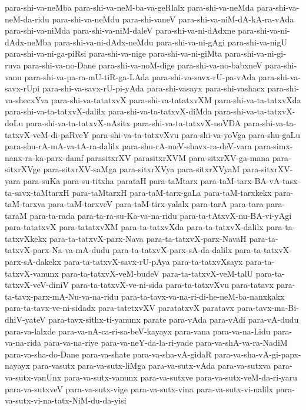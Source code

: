 {para-shi-va-neMba
para-shi-va-neM-ba-va-geRlalx
para-shi-va-neMda
para-shi-va-neM-da-ridu
para-shi-va-neMdu
para-shi-vaneV
para-shi-va-niM-dA-kA-ra-vAda
para-shi-va-niMda
para-shi-va-niM-daleV
para-shi-va-ni-dAdxne
para-shi-va-ni-dAdx-neMba
para-shi-va-ni-dAdx-neMdu
para-shi-va-ni-gAgi
para-shi-va-nigU
para-shi-va-ni-ga-piRsi
para-shi-va-nige
para-shi-va-ni-giMta
para-shi-va-ni-gi-ruva
para-shi-va-no-Dane
para-shi-va-noM-dige
para-shi-va-no-babxneV
para-shi-vanu
para-shi-va-pa-ra-mU-tiR-ga-LAda
para-shi-va-savx-rU-pa-vAda
para-shi-va-savx-rUpi
para-shi-va-savx-rU-pi-yAda
para-shi-vasayx
para-shi-vashacx
para-shi-va-shecxYva
para-shi-va-tatatxvX
para-shi-va-tatatxvXM
para-shi-va-ta-tatxvXda
para-shi-va-ta-tatxvX-dalilx
para-shi-va-ta-tatxvX-diMda
para-shi-va-ta-tatxvX-doLu
para-shi-va-ta-tatxvX-nAsitx
para-shi-va-ta-tatxvX-noVDA
para-shi-va-ta-tatxvX-veM-di-paRveY
para-shi-va-ta-tatxvXvu
para-shi-va-yoVga
para-shu-gaLu
para-shu-rA-mA-va-tA-ra-dalilx
para-shu-rA-meV-shavx-ra-deV-vara
para-simx-nanx-ra-ka-parx-damf
parasitxrXV
parasitxrXVM
para-sitxrXV-ga-mana
para-sitxrXVge
para-sitxrXV-saMga
para-sitxrXVya
para-sitxrXVyaM
para-sitxrXV-yara
para-suKa
para-su-titxha
parataH
para-taMtarx
para-taM-tarx-BA-vA-tasx-ta-savx-taMtarxH
para-taMtarxH
para-taM-tarx-gaLa
para-taM-tarxkekx
para-taM-tarxva
para-taM-tarxveV
para-taM-tirx-yalalx
para-tarA
para-tara
para-taraM
para-ta-rada
para-ta-ra-su-Ka-va-na-ridu
para-ta-tAtxvX-nu-BA-vi-yAgi
para-tatatxvX
para-tatatxvXM
para-ta-tatxvXda
para-ta-tatxvX-dalilx
para-ta-tatxvXkekx
para-ta-tatxvX-parx-Nava
para-ta-tatxvX-parx-NavaH
para-ta-tatxvX-parx-Na-va-mA-dudu
para-ta-tatxvX-parx-sA-da-dalilx
para-ta-tatxvX-parx-sA-dakekx
para-ta-tatxvX-savx-rU-pAya
para-ta-tatxvXsayx
para-ta-tatxvX-vanunx
para-ta-tatxvX-veM-budeV
para-ta-tatxvX-veM-talU
para-ta-tatxvX-veV-diniV
para-ta-tatxvX-ve-ni-sida
para-ta-tatxvXvu
para-tatavx
para-ta-tavx-parx-mA-Nu-va-na-ridu
para-ta-tavx-va-na-ri-di-he-neM-ba-nanxkakx
para-ta-tavx-ve-ni-sidadx
para-tatetxvXV
paratatxvX
paratavx
para-tavx-ma-Bi-dhiV-yateV
para-tavx-sithx-ti-yanunx
parate
para-vAda
para-vAdi
para-vA-dudu
para-va-lalxde
para-va-nA-ca-ri-sa-beV-kayayx
para-vana
para-va-na-Lidu
para-va-na-rida
para-va-na-riye
para-va-neY-da-la-ri-yade
para-va-shA-va-ra-NadiM
para-va-sha-do-Dane
para-va-shate
para-va-sha-vA-gidaR
para-va-sha-vA-gi-papx-nayayx
para-vasutx
para-va-sutx-liMga
para-va-sutx-vAda
para-va-sutxva
para-va-sutx-vanUnx
para-va-sutx-vanunx
para-va-sutxve
para-va-sutx-veM-da-ri-yaru
para-va-sutxveV
para-va-sutx-vige
para-va-sutx-vina
para-va-sutx-vi-nalilx
para-va-sutx-vi-na-tatx-NiM-du-da-yisi
}
